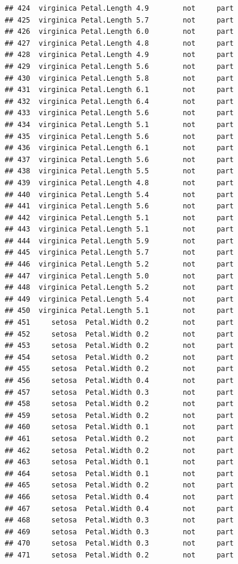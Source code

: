 \documentclass[krantz2]{krantz}\usepackage{knitr}%
\begin{document}
\begin{knitrout}
\begin{kframe}
\begin{verbatim}
## 424  virginica Petal.Length 4.9        not     part
## 425  virginica Petal.Length 5.7        not     part
## 426  virginica Petal.Length 6.0        not     part
## 427  virginica Petal.Length 4.8        not     part
## 428  virginica Petal.Length 4.9        not     part
## 429  virginica Petal.Length 5.6        not     part
## 430  virginica Petal.Length 5.8        not     part
## 431  virginica Petal.Length 6.1        not     part
## 432  virginica Petal.Length 6.4        not     part
## 433  virginica Petal.Length 5.6        not     part
## 434  virginica Petal.Length 5.1        not     part
## 435  virginica Petal.Length 5.6        not     part
## 436  virginica Petal.Length 6.1        not     part
## 437  virginica Petal.Length 5.6        not     part
## 438  virginica Petal.Length 5.5        not     part
## 439  virginica Petal.Length 4.8        not     part
## 440  virginica Petal.Length 5.4        not     part
## 441  virginica Petal.Length 5.6        not     part
## 442  virginica Petal.Length 5.1        not     part
## 443  virginica Petal.Length 5.1        not     part
## 444  virginica Petal.Length 5.9        not     part
## 445  virginica Petal.Length 5.7        not     part
## 446  virginica Petal.Length 5.2        not     part
## 447  virginica Petal.Length 5.0        not     part
## 448  virginica Petal.Length 5.2        not     part
## 449  virginica Petal.Length 5.4        not     part
## 450  virginica Petal.Length 5.1        not     part
## 451     setosa  Petal.Width 0.2        not     part
## 452     setosa  Petal.Width 0.2        not     part
## 453     setosa  Petal.Width 0.2        not     part
## 454     setosa  Petal.Width 0.2        not     part
## 455     setosa  Petal.Width 0.2        not     part
## 456     setosa  Petal.Width 0.4        not     part
## 457     setosa  Petal.Width 0.3        not     part
## 458     setosa  Petal.Width 0.2        not     part
## 459     setosa  Petal.Width 0.2        not     part
## 460     setosa  Petal.Width 0.1        not     part
## 461     setosa  Petal.Width 0.2        not     part
## 462     setosa  Petal.Width 0.2        not     part
## 463     setosa  Petal.Width 0.1        not     part
## 464     setosa  Petal.Width 0.1        not     part
## 465     setosa  Petal.Width 0.2        not     part
## 466     setosa  Petal.Width 0.4        not     part
## 467     setosa  Petal.Width 0.4        not     part
## 468     setosa  Petal.Width 0.3        not     part
## 469     setosa  Petal.Width 0.3        not     part
## 470     setosa  Petal.Width 0.3        not     part
## 471     setosa  Petal.Width 0.2        not     part

\end{verbatim}
\end{kframe}
\end{knitrout}
\end{document}
